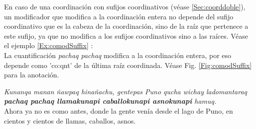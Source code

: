 \documentclass[a4paper,11pt,DIV12]{scrartcl}
\begin{document}
En caso de una coordinaci\'on con sufijos coordinativos (v\'ease \ref{Sec:coorddoble}), un modificador que modifica a la coordinaci\'on entera no depende del sufijo coordinativo que es la cabeza de la coordinaci\'on, sino de la ra\'iz que pertenece a este sufijo, ya que no modifica a los sufijos coordinativos sino a las ra\'ices. V\'ease el ejemplo \ref{Ex:comodSuffix} :\\
La cuantificaci\'on {\em pachaq pachaq} modifica a la coordinaci\'on entera, por eso depende como 'co:qnt' de la \'ultima ra\'iz coordinada. V\'ease Fig. \ref{Fig:comodSuffix} para la anotaci\'on.

\begin{examples}
 \item\label{Ex:comodSuffix} {\em Kunanqa manan ñawpaq hinañachu, gentepas Puno qucha wichay ladomantaraq \textbf{pachaq pachaq llamakunapi caballokunapi asnokunapi} hamuq.}\\
	Ahora ya no es como antes, donde la gente venía desde el lago de Puno, en cientos y cientos de llamas, caballos, asnos.\\
	  	\hfill{\small \citep{Valderrama77}}
\end{examples}
\end{document}
